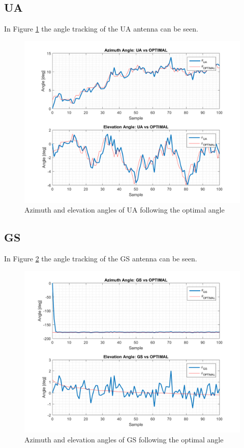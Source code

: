 \subsection{UA}
In Figure \ref{fig:s2_ua} the angle tracking of the UA antenna can be seen.

\begin{figure}[H]
\centering
\includegraphics[scale=0.75]{figures/scenario_2_ua.png}
\caption{Azimuth and elevation angles of UA following the optimal angle}
\label{fig:s2_ua}
\end{figure}

\subsection{GS}
In Figure \ref{fig:s2_gs} the angle tracking of the GS antenna can be seen.

\begin{figure}[H]
\centering
\includegraphics[scale=0.75]{figures/scenario_2_gs.png}
\caption{Azimuth and elevation angles of GS following the optimal angle}
\label{fig:s2_gs}
\end{figure}

